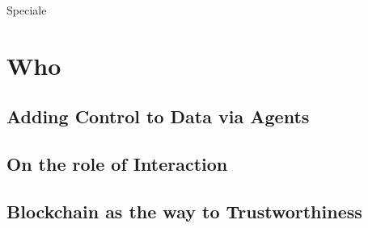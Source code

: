 \documentclass[12pt,a4paper,openright,twoside]{book}
\begin{document}
Speciale

\part{Who}
\label{part:who}

\cite{cncc-extraamas2021-imagination}
\cite{ccnavos-extraamas2021-expectation}

\chapter{Adding Control to Data via Agents}

\chapter{On the role of Interaction}

\cite{tusow-icccn2019}
\cite{respect-idc2017}
\cite{respectx-comsis15}

\chapter{Blockchain as the way to Trustworthiness}

\cite{bctcoord-bct4mas2018wi}
\cite{bctcoord-bct4mas2019}
\cite{bctcoordination-information11}
\cite{blockchain-goodtechs2018}
\cite{proactivesc-blockchain2019}
\cite{blockchainmas-applsci10}



\nocite{*} %


\end{document}
